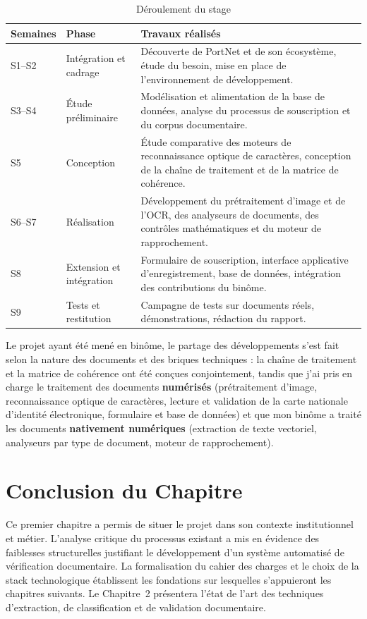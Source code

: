 \begin{table}[H]
\centering
\caption{Déroulement du stage}
\label{tab:planning}
\small
\begin{tabular}{|p{1.8cm}|p{3.8cm}|p{6.6cm}|}
\hline
\textbf{Semaines} & \textbf{Phase} & \textbf{Travaux réalisés} \\
\hline
S1--S2 & Intégration et cadrage &
Découverte de PortNet et de son écosystème, étude du besoin, mise en place de
l'environnement de développement. \\
\hline
S3--S4 & Étude préliminaire &
Modélisation et alimentation de la base de données, analyse du processus de
souscription et du corpus documentaire. \\
\hline
S5 & Conception &
Étude comparative des moteurs de reconnaissance optique de caractères, conception
de la chaîne de traitement et de la matrice de cohérence. \\
\hline
S6--S7 & Réalisation &
Développement du prétraitement d'image et de l'OCR, des analyseurs de documents,
des contrôles mathématiques et du moteur de rapprochement. \\
\hline
S8 & Extension et intégration &
Formulaire de souscription, interface applicative d'enregistrement, base de
données, intégration des contributions du binôme. \\
\hline
S9 & Tests et restitution &
Campagne de tests sur documents réels, démonstrations, rédaction du rapport. \\
\hline
\end{tabular}
\end{table}

Le projet ayant été mené en binôme, le partage des développements s'est fait selon
la nature des documents et des briques techniques : la chaîne de traitement et la
matrice de cohérence ont été conçues conjointement, tandis que j'ai pris en charge
le traitement des documents \textbf{numérisés} (prétraitement d'image,
reconnaissance optique de caractères, lecture et validation de la carte nationale
d'identité électronique, formulaire et base de données) et que mon binôme a traité
les documents \textbf{nativement numériques} (extraction de texte vectoriel,
analyseurs par type de document, moteur de rapprochement).

\section*{Conclusion du Chapitre}

Ce premier chapitre a permis de situer le projet dans son contexte institutionnel et m\'{e}tier. L'analyse critique du processus existant a mis en \'{e}vidence des faiblesses structurelles justifiant le d\'{e}veloppement d'un syst\`{e}me automatis\'{e} de v\'{e}rification documentaire. La formalisation du cahier des charges et le choix de la stack technologique \'{e}tablissent les fondations sur lesquelles s'appuieront les chapitres suivants. Le Chapitre~2 pr\'{e}sentera l'\'{e}tat de l'art des techniques d'extraction, de classification et de validation documentaire.
